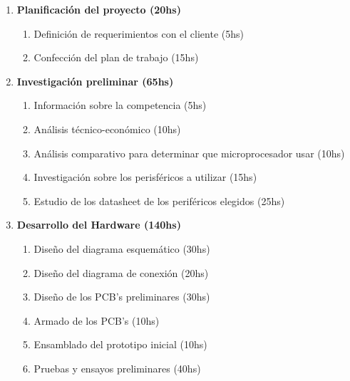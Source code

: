 \documentclass[11pt]{charter}
\begin{document}
\begin{enumerate}
	\item \textbf{Planificación del proyecto (20hs)}
	\begin{enumerate}[label*=\arabic*.]
		\item Definición de requerimientos con el cliente (5hs)
		\item Confección del plan de trabajo (15hs)
	\end{enumerate}

	\item \textbf{Investigación preliminar (65hs)}
	\begin{enumerate}[label*=\arabic*.]
		\item Información sobre la competencia (5hs)
		\item Análisis técnico-económico (10hs)
		\item Análisis comparativo para determinar que microprocesador usar (10hs)	
		\item Investigación sobre los perisféricos a utilizar (15hs)
		\item Estudio de los datasheet de los periféricos elegidos (25hs)   
	\end{enumerate}

	\item \textbf{Desarrollo del Hardware (140hs)}
	\begin{enumerate}[label*=\arabic*.]
		\item Diseño del diagrama esquemático (30hs)
		\item Diseño del diagrama de conexión (20hs)
		\item Diseño de los PCB's preliminares (30hs)	
		\item Armado de los PCB's  (10hs)
		\item Ensamblado del prototipo inicial (10hs)
		\item Pruebas y ensayos preliminares (40hs)   
	\end{enumerate}
	

\end{enumerate}
\end{document}
